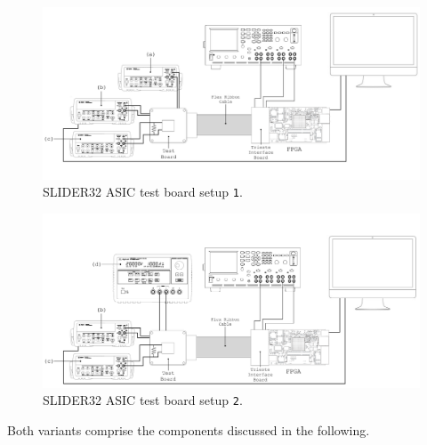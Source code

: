 \begin{figure}[ht]
    \centering
    \includegraphics[width=1\textwidth]{Images/chap1/test_setup_test_board_csavrefgm_auto.png}
    \caption{SLIDER32 ASIC test board setup \texttt{1}.}
    \label{figTESTBOARDsetup1}
\end{figure}

\vspace{-1cm}

\begin{figure}[ht]
    \centering
    \includegraphics[width=1\textwidth]{Images/chap1/test_setup_test_board_csavrefgm_530mv.png}
    \caption{SLIDER32 ASIC test board setup \texttt{2}.}
    \label{figTESTBOARDsetup2}
\end{figure}

\par
\noindent
Both variants comprise the components discussed in the following.

